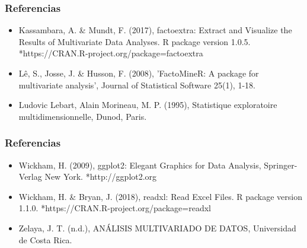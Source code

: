 \documentclass[12pt]{beamer}
\begin{document}
\begin{frame}
\frametitle{Referencias}
\begin{itemize}
\item Kassambara, A. \& Mundt, F. (2017), factoextra: Extract and Visualize the Results of Multivariate
Data Analyses. R package version 1.0.5.
*https://CRAN.R-project.org/package=factoextra


\item Lê, S., Josse, J. \& Husson, F. (2008), 'FactoMineR: A package for multivariate analysis', Journal
of Statistical Software 25(1), 1-18.


\item Ludovic Lebart, Alain Morineau, M. P. (1995), Statistique exploratoire multidimensionnelle, Dunod,
Paris.
\end{itemize}
\end{frame}

\begin{frame}
\frametitle{Referencias}
\begin{itemize}
\item Wickham, H. (2009), ggplot2: Elegant Graphics for Data Analysis, Springer-Verlag New York.
*http://ggplot2.org


\item Wickham, H. \& Bryan, J. (2018), readxl: Read Excel Files. R package version 1.1.0.
*https://CRAN.R-project.org/package=readxl


\item Zelaya, J. T. (n.d.), ANÁLISIS MULTIVARIADO DE DATOS, Universidad de Costa Rica.
\end{itemize}
\end{frame}
\end{document}
